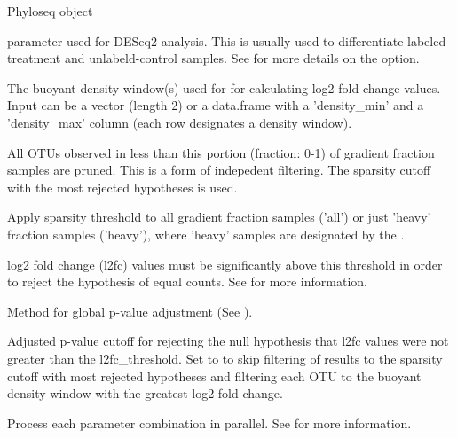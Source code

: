 \documentclass[a4paper]{book}
\begin{document}
\begin{Arguments}
\begin{ldescription}
\item[\code{physeq}] Phyloseq object

\item[\code{design}]  parameter used for DESeq2 analysis.
This is usually used to differentiate labeled-treatment and unlabeld-control samples.
See  for more details on the option.

\item[\code{density\_windows}] The buoyant density window(s) used for for calculating log2
fold change values. Input can be a vector (length 2) or a data.frame with a 'density\_min'
and a 'density\_max' column (each row designates a density window).

\item[\code{sparsity\_threshold}] All OTUs observed in less than this portion (fraction: 0-1)
of gradient fraction samples are pruned. This is a form of indepedent filtering.
The sparsity cutoff with the most rejected hypotheses is used.

\item[\code{sparsity\_apply}] Apply sparsity threshold to all gradient fraction samples ('all')
or just 'heavy' fraction samples ('heavy'), where 'heavy' samples are designated
by the .

\item[\code{l2fc\_threshold}] log2 fold change (l2fc) values must be significantly above this
threshold in order to reject the hypothesis of equal counts.
See  for more information.

\item[\code{padj\_method}] Method for global p-value adjustment (See ).

\item[\code{padj\_cutoff}] Adjusted p-value cutoff for rejecting the null hypothesis
that l2fc values were not greater than the l2fc\_threshold.
Set to  to skip filtering of results to the sparsity cutoff with most
rejected hypotheses and filtering each OTU to the buoyant density window with the
greatest log2 fold change.

\item[\code{parallel}] Process each parameter combination in parallel.
See  for more information.
\end{ldescription}
\end{Arguments}
\end{document}
